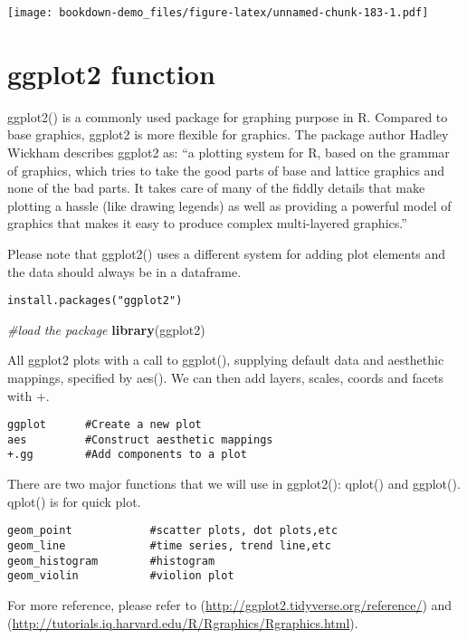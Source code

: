 \documentclass[]{book}
\newenvironment{Shaded}{\begin{snugshade}}{\end{snugshade}}
\newcommand{\KeywordTok}[1]{\textcolor[rgb]{0.13,0.29,0.53}{\textbf{#1}}}
\newcommand{\CommentTok}[1]{\textcolor[rgb]{0.56,0.35,0.01}{\textit{#1}}}
\newcommand{\NormalTok}[1]{#1}
\theoremstyle{definition}
\theoremstyle{definition}
\theoremstyle{definition}
\theoremstyle{remark}
\begin{document}
\texttt{[image: bookdown-demo\_files/figure-latex/unnamed-chunk-183-1.pdf]}

\section{ggplot2 function}\label{ggplot2-function}

ggplot2() is a commonly used package for graphing purpose in R. Compared
to base graphics, ggplot2 is more flexible for graphics. The package
author Hadley Wickham describes ggplot2 as: ``a plotting system for R,
based on the grammar of graphics, which tries to take the good parts of
base and lattice graphics and none of the bad parts. It takes care of
many of the fiddly details that make plotting a hassle (like drawing
legends) as well as providing a powerful model of graphics that makes it
easy to produce complex multi-layered graphics.''

Please note that ggplot2() uses a different system for adding plot
elements and the data should always be in a dataframe.

\begin{verbatim}
install.packages("ggplot2")
\end{verbatim}

\begin{Shaded}
\begin{Highlighting}[]
\CommentTok{#load the package}
\KeywordTok{library}\NormalTok{(ggplot2)}
\end{Highlighting}
\end{Shaded}

All ggplot2 plots with a call to ggplot(), supplying default data and
aesthethic mappings, specified by aes(). We can then add layers, scales,
coords and facets with +.

\begin{verbatim}
ggplot      #Create a new plot
aes         #Construct aesthetic mappings
+.gg        #Add components to a plot
\end{verbatim}

There are two major functions that we will use in ggplot2(): qplot() and
ggplot(). qplot() is for quick plot.

\begin{verbatim}
geom_point            #scatter plots, dot plots,etc
geom_line             #time series, trend line,etc
geom_histogram        #histogram
geom_violin           #violion plot
\end{verbatim}

For more reference, please refer to
(\url{http://ggplot2.tidyverse.org/reference/}) and
(\url{http://tutorials.iq.harvard.edu/R/Rgraphics/Rgraphics.html}).
\end{document}
